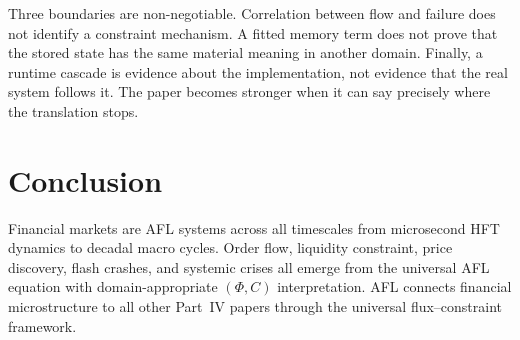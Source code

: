 \documentclass[11pt]{article}
\begin{document}
Three boundaries are non-negotiable. Correlation between flow and failure does
not identify a constraint mechanism. A fitted memory term does not prove that
the stored state has the same material meaning in another domain. Finally, a
runtime cascade is evidence about the implementation, not evidence that the
real system follows it. The paper becomes stronger when it can say precisely
where the translation stops.



\section{Conclusion}

Financial markets are AFL systems across all timescales from microsecond HFT dynamics to
decadal macro cycles. Order flow, liquidity constraint, price discovery, flash crashes, and
systemic crises all emerge from the universal AFL equation with domain-appropriate $(\Phi, C)$
interpretation. AFL connects financial microstructure to all other Part~IV papers through the
universal flux--constraint framework.



\end{document}
